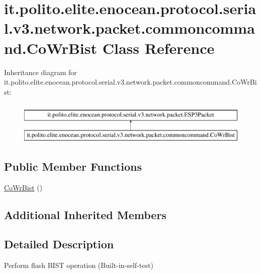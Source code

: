 \hypertarget{classit_1_1polito_1_1elite_1_1enocean_1_1protocol_1_1serial_1_1v3_1_1network_1_1packet_1_1commoncommand_1_1_co_wr_bist}{}\section{it.\+polito.\+elite.\+enocean.\+protocol.\+serial.\+v3.\+network.\+packet.\+commoncommand.\+Co\+Wr\+Bist Class Reference}
\label{classit_1_1polito_1_1elite_1_1enocean_1_1protocol_1_1serial_1_1v3_1_1network_1_1packet_1_1commoncommand_1_1_co_wr_bist}
Inheritance diagram for it.\+polito.\+elite.\+enocean.\+protocol.\+serial.\+v3.\+network.\+packet.\+commoncommand.\+Co\+Wr\+Bist\+:\begin{figure}[H]
\begin{center}
\leavevmode
\includegraphics[height=2.000000cm]{classit_1_1polito_1_1elite_1_1enocean_1_1protocol_1_1serial_1_1v3_1_1network_1_1packet_1_1commoncommand_1_1_co_wr_bist}
\end{center}
\end{figure}
\subsection*{Public Member Functions}
\begin{DoxyCompactItemize}
\item 
\hyperlink{classit_1_1polito_1_1elite_1_1enocean_1_1protocol_1_1serial_1_1v3_1_1network_1_1packet_1_1commoncommand_1_1_co_wr_bist_a9170729c969f69d09bc7c89d777035be}{Co\+Wr\+Bist} ()
\end{DoxyCompactItemize}
\subsection*{Additional Inherited Members}


\subsection{Detailed Description}
Perform flash B\+I\+ST operation (Built-\/in-\/self-\/test)

